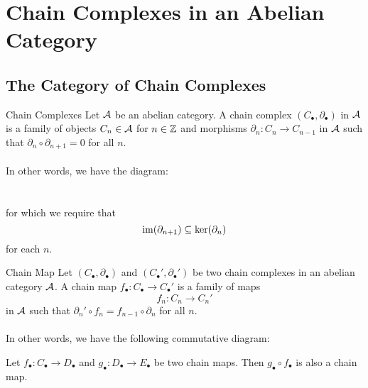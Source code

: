 \documentclass[a4paper]{article}
\begin{document}
\pagebreak
\section{Chain Complexes in an Abelian Category}
\subsection{The Category of Chain Complexes}
\begin{defn}{Chain Complexes}{} Let $\mathcal{A}$ be an abelian category. A chain complex $(C_\bullet,\partial_\bullet)$ in $\mathcal{A}$ is a family of objects $C_n\in\mathcal{A}$ for $n\in\mathbb{Z}$ and morphisms $\partial_n:C_n\to C_{n-1}$ in $\mathcal{A}$ such that $\partial_n\circ\partial_{n+1}=0$ for all $n$. \\~\\
In other words, we have the diagram: \\
\\~\\
for which we require that $$\operatorname{im}(\partial_{n+1})\subseteq\ker(\partial_n)$$ for each $n$. 
\end{defn}

\begin{defn}{Chain Map}{} Let $(C_\bullet,\partial_\bullet)$ and $(C_\bullet',\partial_\bullet')$ be two chain complexes in an abelian category $\mathcal{A}$. A chain map $f_\bullet:C_\bullet\to C_\bullet'$ is a family of maps $$f_n:C_n\to C_n'$$ in $\mathcal{A}$ such that $\partial_n'\circ f_n=f_{n-1}\circ\partial_n$ for all $n$. \\~\\
In other words, we have the following commutative diagram: \\
\end{defn}

\begin{prp}{}{} Let $f_\bullet:C_\bullet\to D_\bullet$ and $g_\bullet:D_\bullet\to E_\bullet$ be two chain maps. Then $g_\bullet\circ f_\bullet$ is also a chain map. \tcbline
\end{prp}
\end{document}
